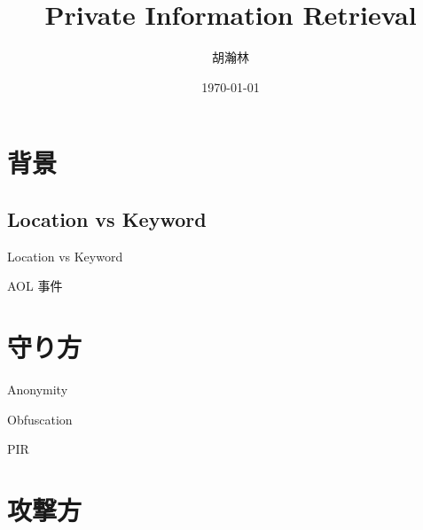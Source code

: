 \documentclass[14pt,xcolor=dvipsnames,table,dvipdfmx]{beamer}
\title{\bfseries Private Information Retrieval}
\author{胡瀚林}
\date{\today}
\begin{document}
\maketitle
\frame{\tableofcontents[hideallsubsections]}

\section{背景}
\begin{frame}
\end{frame}

\subsection{Location vs Keyword}
\begin{frame}{Location vs Keyword}
\end{frame}
\begin{frame}{AOL 事件}
\end{frame}
\begin{frame}
\end{frame}

\section{守り方}
\begin{frame}{Anonymity}
\end{frame}
\begin{frame}{Obfuscation}
\end{frame}
\begin{frame}{PIR}
\end{frame}

\section{攻撃方}
\begin{frame}
\end{frame}
\begin{frame}
\end{frame}
\begin{frame}
\end{frame}
\end{document}
